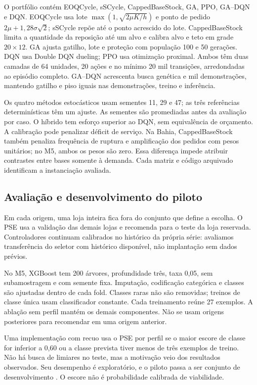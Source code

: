 \documentclass[preprint,12pt]{elsarticle}
\begin{document}
O portfólio contém EOQCycle, sSCycle, CappedBaseStock, GA, PPO, GA--DQN e DQN. EOQCycle usa lote $\max(1,\sqrt{2\mu K/h})$ e ponto de pedido $2\mu+1{,}28\sigma\sqrt2$; sSCycle repõe até o ponto acrescido do lote. CappedBaseStock limita a quantidade da reposição até um alvo e calibra alvo e teto em grade $20\times12$. GA ajusta gatilho, lote e proteção com população 100 e 50 gerações. DQN usa Double DQN dueling; PPO usa otimização proximal. Ambos têm duas camadas de 64 unidades, 20 ações e no mínimo 20 mil transições, arredondadas ao episódio completo. GA--DQN acrescenta busca genética e mil demonstrações, mantendo gatilho e piso iguais nas demonstrações, treino e inferência.

Os quatro métodos estocásticos usam sementes 11, 29 e 47; as três referências determinísticas têm um ajuste. As sementes são promediadas antes da avaliação por caso. O híbrido tem esforço superior ao DQN, sem equivalência de orçamento. A calibração pode penalizar déficit de serviço. Na Bahia, CappedBaseStock também penaliza frequência de ruptura e amplificação dos pedidos com pesos unitários; no M5, ambos os pesos são zero. Essa diferença impede atribuir contrastes entre bases somente à demanda. Cada matriz e código arquivado identificam a instanciação avaliada.

\subsection{Avaliação e desenvolvimento do piloto}
Em cada origem, uma loja inteira fica fora do conjunto que define a escolha. O PSE usa a validação das demais lojas e recomenda para o teste da loja reservada. Controladores continuam calibrados no histórico da própria série: avaliamos transferência do seletor com histórico disponível, não implantação sem dados prévios.

No M5, XGBoost tem 200 árvores, profundidade três, taxa 0,05, sem subamostragem e com semente fixa. Imputação, codificação categórica e classes são ajustadas dentro de cada fold. Classes raras não são removidas; treinos de classe única usam classificador constante. Cada treinamento reúne 27 exemplos. A ablação sem perfil mantém os demais componentes. Não se usam origens posteriores para recomendar em uma origem anterior.

Uma implementação com recuo usa o PSE por perfil se o maior escore de classe for inferior a 0,60 ou a classe prevista tiver menos de três exemplos de treino. Não há busca de limiares no teste, mas a motivação veio dos resultados observados. Seu desempenho é exploratório, e o piloto passa a ser conjunto de desenvolvimento \cite{CawleyTalbot2010}. O escore não é probabilidade calibrada de viabilidade.
\end{document}
